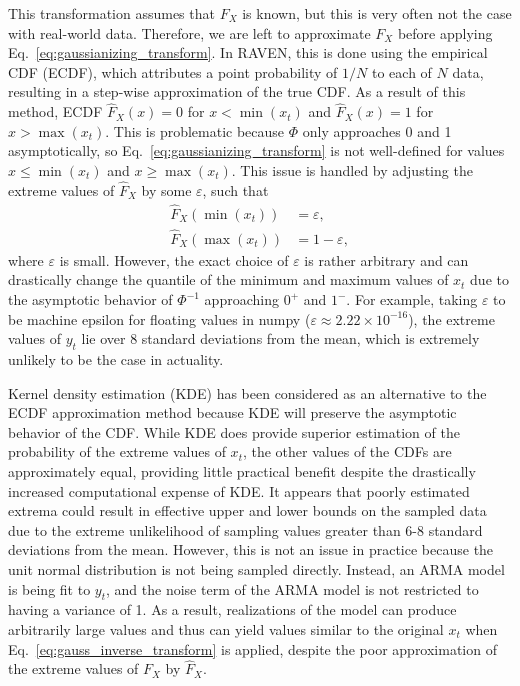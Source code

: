 This transformation assumes that $F_X$ is known, but this is very often not the case with real-world data.
Therefore, we are left to approximate $F_X$ before applying Eq.~\ref{eq:gaussianizing_transform}.
In RAVEN, this is done using the empirical CDF (ECDF), which attributes a point probability of $1 / N$ to each of $N$ data, resulting in a step-wise approximation of the true CDF.
As a result of this method, ECDF $\hat{F}_X(x) = 0$ for $x < \min(x_t)$ and $\hat{F}_X(x) = 1$ for $x > \max(x_t)$.
This is problematic because $\Phi$ only approaches 0 and 1 asymptotically, so Eq.~\ref{eq:gaussianizing_transform} is not well-defined for values $x \leq \min(x_t)$ and $x \geq \max(x_t)$.
This issue is handled by adjusting the extreme values of $\hat{F}_X$ by some $\varepsilon$, such that
\begin{align*}
	\hat{F}_X(\min(x_t)) &= \varepsilon, \\
	\hat{F}_X(\max(x_t)) &= 1 - \varepsilon,
\end{align*}
where $\varepsilon$ is small.
However, the exact choice of $\varepsilon$ is rather arbitrary and can drastically change the quantile of the minimum and maximum values of $x_t$ due to the asymptotic behavior of $\Phi^{-1}$ approaching $0^+$ and $1^-$.
For example, taking $\varepsilon$ to be machine epsilon for floating values in numpy ($\varepsilon \approx 2.22 \times 10^{-16}$), the extreme values of $y_t$ lie over 8 standard deviations from the mean, which is extremely unlikely to be the case in actuality.

Kernel density estimation (KDE) has been considered as an alternative to the ECDF approximation method because KDE will preserve the asymptotic behavior of the CDF.
While KDE does provide superior estimation of the probability of the extreme values of $x_t$, the other values of the CDFs are approximately equal, providing little practical benefit despite the drastically increased computational expense of KDE.
It appears that poorly estimated extrema could result in effective upper and lower bounds on the sampled data due to the extreme unlikelihood of sampling values greater than 6-8 standard deviations from the mean.
However, this is not an issue in practice because the unit normal distribution is not being sampled directly.
Instead, an ARMA model is being fit to $y_t$, and the noise term of the ARMA model is not restricted to having a variance of 1.
As a result, realizations of the model can produce arbitrarily large values and thus can yield values similar to the original $x_t$ when Eq.~\ref{eq:gauss_inverse_transform} is applied, despite the poor approximation of the extreme values of $F_X$ by $\hat{F}_X$.
